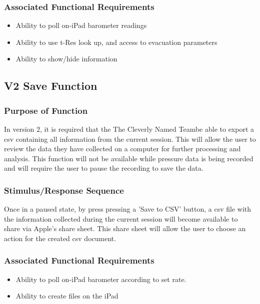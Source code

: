 \documentclass[onecolumn, draftclsnofoot,10pt, compsoc]{IEEEtran}
\def \CapstoneTeamName{The Cleverly Named Team}
\begin{document}
\subsubsection{Associated Functional Requirements}
\begin{itemize}
\item Ability to poll on-iPad barometer readings
\item Ability to use t-Res look up, and access to evacuation parameters
\item Ability to show/hide information
\end{itemize}

\subsection{V2 Save Function}
\subsubsection{Purpose of Function}
In version 2, it is required that the \CapstoneTeamName be able to export a csv containing all information from the current session.
This will allow the user to review the data they have collected on a computer for further processing and analysis.
This function will not be available while pressure data is being recorded and will require the user to pause the recording to save the data.
\subsubsection{Stimulus/Response Sequence}
Once in a paused state, by press pressing a 'Save to CSV' button, a csv file with the information collected during the current session will become available to share via Apple's share sheet.
This share sheet will allow the user to choose an action for the created csv document.
\subsubsection{Associated Functional Requirements}
\begin{itemize}
\item Ability to poll on-iPad barometer according to set rate.
\item Ability to create files on the iPad
\end{itemize}
\end{document}
